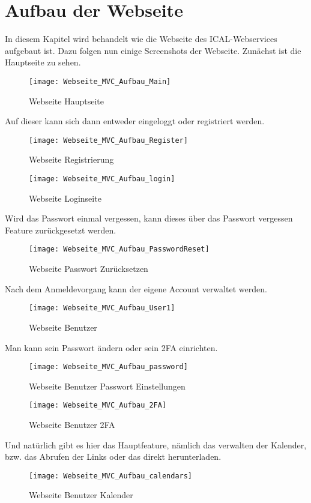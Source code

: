 {\section{Aufbau der Webseite }
\label{sec:aufbau}
In diesem Kapitel wird behandelt wie die Webseite des ICAL-Webservices aufgebaut ist. Dazu folgen nun einige Screenshots der Webseite.
Zunächst ist die Hauptseite zu sehen.\\
\begin{figure}[H]
    \texttt{[image: Webseite\_MVC\_Aufbau\_Main]}
    \caption{Webseite Hauptseite}
    \label{fig:webmainpage}
\end{figure}
Auf dieser kann sich dann entweder eingeloggt oder registriert werden.\\
\begin{figure}[H]
    \texttt{[image: Webseite\_MVC\_Aufbau\_Register]}
    \caption{Webseite Registrierung}
    \label{fig:webregister}
\end{figure}
\begin{figure}[H]
    \texttt{[image: Webseite\_MVC\_Aufbau\_login]}
    \caption{Webseite Loginseite}
    \label{fig:weblogin}
\end{figure}
Wird das Passwort einmal vergessen, kann dieses über das Passwort vergessen Feature zurückgesetzt werden. 
\begin{figure}[H]
    \texttt{[image: Webseite\_MVC\_Aufbau\_PasswordReset]}
    \caption{Webseite Passwort Zurücksetzen}
    \label{fig:webpwdforgot}
\end{figure}
Nach dem Anmeldevorgang kann der eigene Account verwaltet werden.\\
\begin{figure}[H]
    \texttt{[image: Webseite\_MVC\_Aufbau\_User1]}
    \caption{Webseite Benutzer}
    \label{fig:webuser}
\end{figure}
Man kann sein Passwort ändern oder sein 2FA einrichten. \\
\begin{figure}[H]
    \texttt{[image: Webseite\_MVC\_Aufbau\_password]}
    \caption{Webseite Benutzer Passwort Einstellungen}
    \label{fig:webuserpwd}
\end{figure}
\begin{figure}[H]
    \texttt{[image: Webseite\_MVC\_Aufbau\_2FA]}
    \caption{Webseite Benutzer 2FA}
    \label{fig:webuser2fa}
\end{figure}
Und natürlich gibt es hier das Hauptfeature, nämlich das verwalten der Kalender, bzw. das Abrufen der Links oder das direkt herunterladen.\\
\begin{figure}[H]
    \texttt{[image: Webseite\_MVC\_Aufbau\_calendars]}
    \caption{Webseite Benutzer Kalender}
    \label{fig:webusercal}
\end{figure}
}
